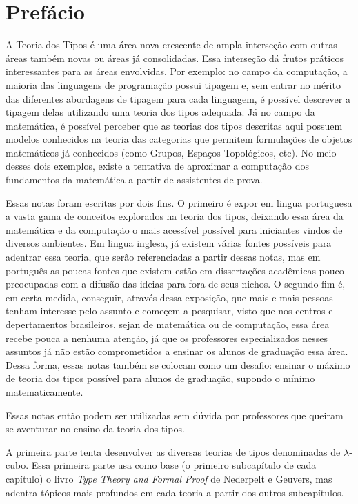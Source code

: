\documentclass[../main.tex]{subfiles}
\begin{document}
\section{Prefácio}


A Teoria dos Tipos é uma área nova crescente de ampla interseção com outras áreas também novas ou áreas já consolidadas. Essa interseção dá frutos práticos interessantes para as áreas envolvidas. Por exemplo: no campo da computação, a maioria das linguagens de programação possui tipagem e, sem entrar no mérito das diferentes abordagens de tipagem para cada linguagem, é possível descrever a tipagem delas utilizando uma teoria dos tipos adequada. Já no campo da matemática, é possível perceber que as teorias dos tipos descritas aqui possuem modelos conhecidos na teoria das categorias que permitem formulações de objetos matemáticos já conhecidos (como Grupos, Espaços Topológicos, etc). No meio desses dois exemplos, existe a tentativa de aproximar a computação dos fundamentos da matemática a partir de assistentes de prova. 

Essas notas foram escritas por dois fins. O primeiro é expor em lingua portuguesa a vasta gama de conceitos explorados na teoria dos tipos, deixando essa área da matemática e da computação o mais acessível possível para iniciantes vindos de diversos ambientes. Em lingua inglesa, já existem várias fontes possíveis para adentrar essa teoria, que serão referenciadas a partir dessas notas, mas em português as poucas fontes que existem estão em dissertações acadêmicas pouco preocupadas com a difusão das ideias para fora de seus nichos. O segundo fim é, em certa medida, conseguir, através dessa exposição, que mais e mais pessoas tenham interesse pelo assunto e começem a pesquisar, visto que nos centros e depertamentos brasileiros, sejan de matemática ou de computação, essa área recebe pouca a nenhuma atenção, já que os professores especializados nesses assuntos já não estão comprometidos a ensinar os alunos de graduação essa área. Dessa forma, essas notas também se colocam como um desafio: ensinar o máximo de teoria dos tipos possível para alunos de graduação, supondo o mínimo matematicamente. 

Essas notas então podem ser utilizadas sem dúvida por professores que queiram se aventurar no ensino da teoria dos tipos.

A primeira parte tenta desenvolver as diversas teorias de tipos denominadas de $\lambda$-cubo. Essa primeira parte usa como base (o primeiro subcapítulo de cada capítulo) o livro \emph{Type Theory and Formal Proof} de Nederpelt e Geuvers, mas adentra tópicos mais profundos em cada teoria a partir dos outros subcapítulos.
\end{document}
